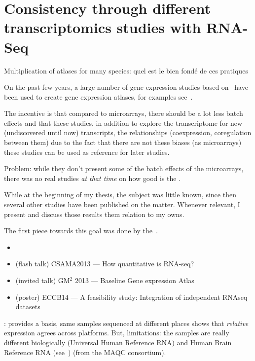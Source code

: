 \chapter{Consistency through different transcriptomics studies with RNA-Seq}
\label{ch:Transcriptomics}

Multiplication of atlases for many species: quel est le bien fondé de ces pratiques

On the past few years, a large number of gene expression studies based on
\Rnaseq\ have been used to create gene expression
atlases, for examples see~.

The incentive is that compared to microarrays, there should be a lot less
batch effects and that these studies, in addition to explore the transcriptome
for new (undiscovered until now) transcripts, the relationships (coexpression,
coregulation between them) due to the fact that there are not these biases (as
microarrays) these studies can be used as reference for later studies.

Problem: while they don't present some of the batch effects of the microarrays,
there was no real studies \emph{at that time} on how good is the \Rnaseq.

While at the beginning of my thesis,
the subject was little known,
since then several other studies have been published on the matter.
Whenever relevant, I present and discuss those results them relation to my owns.

The first piece towards this goal was done by the~.


\begin{itemize}[topsep=0pt,nosep]
    \item {}
    \item (flash talk) CSAMA2013 --- How quantitative is RNA-seq?
    \item (invited talk) GM$^2$ 2013 --- Baseline Gene expression Atlas
    \item (poster) ECCB14 --- A feasibility study:
        Integration of independent RNAseq datasets
\end{itemize}


: provides a basis, same samples sequenced at different places
shows that \emph{relative} expression agrees across platforms. But, limitations:
the samples are really different biologically (Universal Human Reference RNA) and
Human Brain Reference RNA (see~)
(from the \gls{MAQC} consortium).

